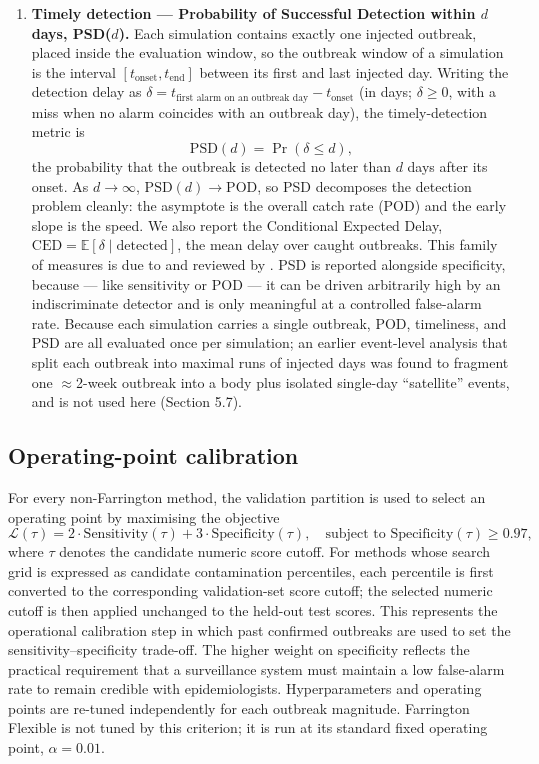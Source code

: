 \documentclass[11pt]{article}
\begin{document}
\begin{enumerate}
\item \textbf{Timely detection --- Probability of Successful Detection within $d$ days, PSD($d$).} Each simulation contains exactly one injected outbreak, placed inside the evaluation window, so the outbreak window of a simulation is the interval $[t_{\text{onset}}, t_{\text{end}}]$ between its first and last injected day. Writing the detection delay as $\delta = t_{\text{first alarm on an outbreak day}} - t_{\text{onset}}$ (in days; $\delta \geq 0$, with a miss when no alarm coincides with an outbreak day), the timely-detection metric is
\[
\mathrm{PSD}(d) = \Pr(\delta \leq d),
\]
the probability that the outbreak is detected no later than $d$ days after its onset. As $d \to \infty$, $\mathrm{PSD}(d) \to \mathrm{POD}$, so PSD decomposes the detection problem cleanly: the asymptote is the overall catch rate (POD) and the early slope is the speed. We also report the Conditional Expected Delay, $\mathrm{CED} = \mathbb{E}[\delta \mid \text{detected}]$, the mean delay over caught outbreaks. This family of measures is due to \citet{frisen2003} and reviewed by \citet{sonesson2003}. PSD is reported alongside specificity, because --- like sensitivity or POD --- it can be driven arbitrarily high by an indiscriminate detector and is only meaningful at a controlled false-alarm rate. Because each simulation carries a single outbreak, POD, timeliness, and PSD are all evaluated once per simulation; an earlier event-level analysis that split each outbreak into maximal runs of injected days was found to fragment one $\approx$2-week outbreak into a body plus isolated single-day ``satellite'' events, and is not used here (Section 5.7).
\end{enumerate}

\subsection{Operating-point calibration}

For every non-Farrington method, the validation partition is used to select an operating point by maximising the objective
\[
\mathcal{L}(\tau) = 2 \cdot \text{Sensitivity}(\tau) + 3 \cdot \text{Specificity}(\tau), \quad \text{subject to } \text{Specificity}(\tau) \geq 0.97,
\]
where $\tau$ denotes the candidate numeric score cutoff. For methods whose search grid is expressed as candidate contamination percentiles, each percentile is first converted to the corresponding validation-set score cutoff; the selected numeric cutoff is then applied unchanged to the held-out test scores. This represents the operational calibration step in which past confirmed outbreaks are used to set the sensitivity--specificity trade-off. The higher weight on specificity reflects the practical requirement that a surveillance system must maintain a low false-alarm rate to remain credible with epidemiologists. Hyperparameters and operating points are re-tuned independently for each outbreak magnitude. Farrington Flexible is not tuned by this criterion; it is run at its standard fixed operating point, $\alpha = 0.01$.
\end{document}

